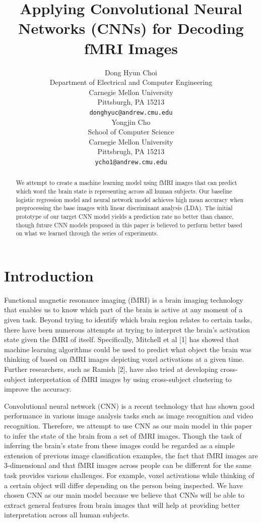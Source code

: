 \documentclass{article} %
\title{Applying Convolutional Neural Networks (CNNs) for Decoding fMRI Images}
\author{
Dong Hyun Choi \\
Department of Electrical and Computer Engineering\\
Carnegie Mellon University\\
Pittsburgh, PA 15213 \\
\texttt{donghyuc@andrew.cmu.edu} \\
\And
Yongjin Cho \\
School of Computer Science \\
Carnegie Mellon University \\
Pittsbrugh, PA 15213\\
\texttt{ycho1@andrew.cmu.edu} \\
}
\begin{document}
\maketitle

\begin{abstract}
We attempt to create a machine learning model using fMRI images that can predict which word the brain state is representing across all human subjects. Our baseline logistic regression model and neural network model achieves high mean accuracy when preprocessing the base images with linear discriminant analysis (LDA). The initial prototype of our target CNN model yields a prediction rate no better than chance, though future CNN models proposed in this paper is believed to perform better based on what we learned through the series of experiments.
\end{abstract}

\section{Introduction}

Functional magnetic resonance imaging (fMRI) is a brain imaging technology that enables us to know which part of the brain is active at any moment of a given task. Beyond trying to identify which brain region relates to certain tasks, there have been numerous attempts at trying to interpret the brain's activation state given the fMRI of itself. Specifically, Mitchell et al [1] has showed that machine learning algorithms could be used to predict what object the brain was thinking of based on fMRI images depicting voxel activations at a given time. Further researchers, such as Ramish [2], have also tried at developing cross-subject interpretation of fMRI images by using cross-subject clustering to improve the accuracy.

Convolutional neural network (CNN) is a recent technology that has shown good performance in various image analysis tasks such as image recognition and video recognition. Therefore, we attempt to use CNN as our main model in this paper to infer the state of the brain from a set of fMRI images. Though the task of inferring the brain's state from these images could be regarded as a simple extension of previous image classification examples, the fact that fMRI images are 3-dimensional and that fMRI images across people can be different for the same task provides various challenges. For example, voxel activations while thinking of a certain object will differ depending on the person being inspected. We have chosen CNN as our main model because we believe that CNNs will be able to extract general features from brain images that will help at providing better interpretation across all human subjects.
\end{document}
